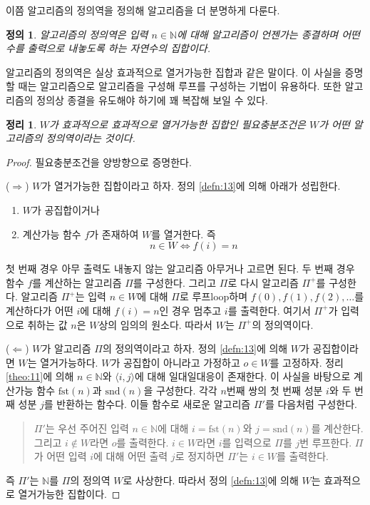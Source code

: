\documentclass[a4paper,chapter,atbegshi]{oblivoir}
\newtheorem{defn}{정의}[chapter]
\newtheorem{theo}{정리}[chapter]
\begin{document}
이쯤 알고리즘의 정의역을 정의해 알고리즘을 더 분명하게 다룬다.
\begin{defn}
  알고리즘의 정의역은 입력 $n\in\mathbb{N}$에 대해 알고리즘이 언젠가는
  종결하며 어떤 수를 출력으로 내놓도록 하는 자연수의 집합이다. 
\end{defn}
알고리즘의 정의역은 실상 효과적으로 열거가능한 집합과 같은 말이다. 이 사실을
증명할 때는 알고리즘으로 알고리즘을 구성해 루프를 구성하는 기법이 유용하다.
또한 알고리즘의 정의상 종결을 유도해야 하기에 꽤 복잡해 보일 수 있다.
\begin{theo}\label{theo:17}
  $W$가 효과적으로 효과적으로 열거가능한 집합인 필요충분조건은 $W$가
  어떤 알고리즘의 정의역이라는 것이다.
\end{theo}
\begin{proof}
  필요충분조건을 양방향으로 증명한다.

  ($\Rightarrow$)
  $W$가 열거가능한 집합이라고 하자. 정의 \ref{defn:13}에 의해 아래가
  성립한다.
  \begin{enumerate}
    \item $W$가 공집합이거나
    \item 계산가능 함수 $f$가 존재하여 $W$를 열거한다. 즉
      \[
        n\in W\iff f(i)=n
      \]
  \end{enumerate}
  첫 번째 경우 아무 출력도 내놓지 않는 알고리즘 아무거나 고르면 된다.
  두 번째 경우 함수 $f$를 계산하는 알고리즘 $\Pi$를 구성한다. 그리고 $\Pi$로
  다시 알고리즘 $\Pi^+$를 구성한다. 알고리즘 $\Pi^+$는 입력 $n\in W$에 대해
  $\Pi$로 루프{\tiny loop}하며 $f(0),f(1),f(2),\ldots$를 계산하다가 어떤 $i$에
  대해 $f(i)=n$인 경우 멈추고 $i$를 출력한다. 여기서 $\Pi^+$가 입력으로
  취하는 값 $n$은 $W$상의 임의의 원소다. 따라서 $W$는 $\Pi^+$의 정의역이다.

  ($\Leftarrow$) $W$가 알고리즘 $\Pi$의 정의역이라고 하자. 정의 \ref{defn:13}에
  의해 $W$가 공집합이라면 $W$는 열거가능하다. $W$가 공집합이 아니라고
  가정하고 $o\in W$를 고정하자.
  정리 \ref{theo:11}에 의해 $n\in\mathbb{N}$와 $\langle i,j\rangle$에 대해
  일대일대응이 존재한다.
  이 사실을 바탕으로 계산가능 함수 $\textrm{fst}(n)$과 $\textrm{snd}(n)$을 
  구성한다. 각각 $n$번째 쌍의 첫 번째 성분 $i$와 두 번째 성분 $j$를 반환하는
  함수다. 이들 함수로 새로운 알고리즘 $\Pi'$를 다음처럼 구성한다.
  \begin{quote}
  $\Pi'$는 우선 주어진 입력 $n\in\mathbb{N}$에 대해 $i=\textrm{fst}(n)$와
  $j=\textrm{snd}(n)$를 계산한다. 그리고 $i\notin W$라면 $o$를 출력한다. 
  $i\in W$라면 $i$를 입력으로 $\Pi$를 $j$번 루프한다. $\Pi$가 어떤 입력
  $i$에 대해 어떤 출력 $j$로 정지하면 $\Pi'$는 $i\in W$를 출력한다.
  \end{quote}
  즉 $\Pi'$는 $\mathbb{N}$를 $\Pi$의 정의역 $W$로 사상한다. 따라서 정의 
  \ref{defn:13}에 의해 $W$는 효과적으로 열거가능한 집합이다.
\end{proof}
\end{document}

